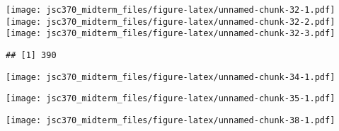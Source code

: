 \documentclass[
]{article}
\begin{document}
\texttt{[image: jsc370\_midterm\_files/figure-latex/unnamed-chunk-32-1.pdf]}
\texttt{[image: jsc370\_midterm\_files/figure-latex/unnamed-chunk-32-2.pdf]}
\texttt{[image: jsc370\_midterm\_files/figure-latex/unnamed-chunk-32-3.pdf]}

\begin{verbatim}
## [1] 390
\end{verbatim}

\texttt{[image: jsc370\_midterm\_files/figure-latex/unnamed-chunk-34-1.pdf]}

\texttt{[image: jsc370\_midterm\_files/figure-latex/unnamed-chunk-35-1.pdf]}

\texttt{[image: jsc370\_midterm\_files/figure-latex/unnamed-chunk-38-1.pdf]}
\end{document}
